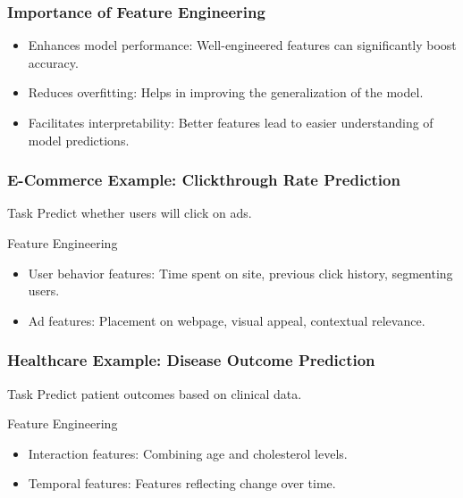 \documentclass[aspectratio=169]{beamer}
\begin{document}
\begin{frame}
    \frametitle{Importance of Feature Engineering}
    \begin{itemize}
        \item Enhances model performance: Well-engineered features can significantly boost accuracy.
        \item Reduces overfitting: Helps in improving the generalization of the model.
        \item Facilitates interpretability: Better features lead to easier understanding of model predictions.
    \end{itemize}
\end{frame}

\begin{frame}
    \frametitle{E-Commerce Example: Clickthrough Rate Prediction}
    \begin{block}{Task}
        Predict whether users will click on ads.
    \end{block}
    \begin{block}{Feature Engineering}
        \begin{itemize}
            \item User behavior features: Time spent on site, previous click history, segmenting users.
            \item Ad features: Placement on webpage, visual appeal, contextual relevance.
        \end{itemize}
    \end{block}
\end{frame}

\begin{frame}
    \frametitle{Healthcare Example: Disease Outcome Prediction}
    \begin{block}{Task}
        Predict patient outcomes based on clinical data.
    \end{block}
    \begin{block}{Feature Engineering}
        \begin{itemize}
            \item Interaction features: Combining age and cholesterol levels.
            \item Temporal features: Features reflecting change over time.
        \end{itemize}
    \end{block}
\end{frame}
\end{document}
